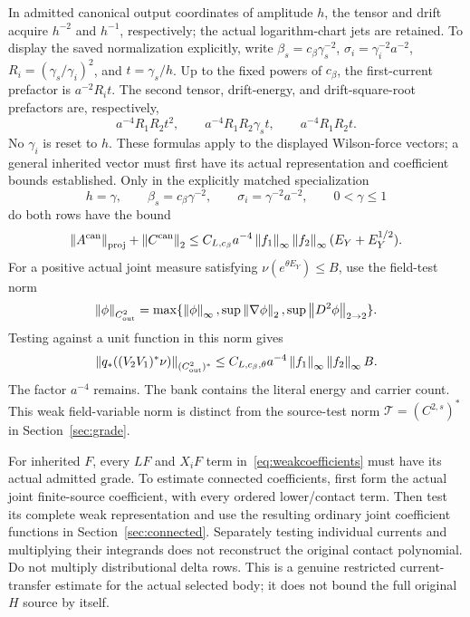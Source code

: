 \documentclass[11pt,letterpaper]{article}
\theoremstyle{plain}
\theoremstyle{remark}\newtheorem{remark}[theorem]{Scope}
\newcommand{\norm}[1]{\left\lVert#1\right\rVert}
\newcommand{\cT}{\mathcal T}\newcommand{\eps}{\varepsilon}
\begin{document}
In admitted canonical output coordinates of amplitude $h$, the tensor and
drift acquire $h^{-2}$ and $h^{-1}$, respectively; the actual logarithm-chart
jets are retained. To display the saved normalization explicitly, write
$\beta_s=c_\beta\gamma_s^{-2}$, $\sigma_i=\gamma_i^{-2}a^{-2}$,
$R_i=(\gamma_s/\gamma_i)^2$, and $t=\gamma_s/h$. Up to the fixed powers
of $c_\beta$, the first-current prefactor is $a^{-2}R_it$. The second
tensor, drift-energy, and drift-square-root prefactors are, respectively,
\begin{equation}
a^{-4}R_1R_2t^2,\qquad
a^{-4}R_1R_2\gamma_st,\qquad
a^{-4}R_1R_2t.
\label{eq:savedcurrentratios}
\end{equation}
No $\gamma_i$ is reset to $h$. These formulas apply to the displayed
Wilson-force vectors; a general inherited vector must first have its actual
representation and coefficient bounds established. Only in the explicitly
matched specialization
\begin{equation}
h=\gamma,\qquad \beta_s=c_\beta\gamma^{-2},\qquad
\sigma_i=\gamma^{-2}a^{-2},\qquad 0<\gamma\le1
\label{eq:matchedcurrent}
\end{equation}
do both rows have the bound
\begin{equation}
\norm{A^{\rm can}}_{\rm proj}+\norm{C^{\rm can}}_2
\le C_{L,c_\beta}a^{-4}\norm{f_1}_\infty\norm{f_2}_\infty
(E_Y+E_Y^{1/2}).
\label{eq:physicalcurrentbound}
\end{equation}
For a positive actual joint measure satisfying
$\nu(e^{\theta E_Y})\le B$, use the field-test norm
\begin{equation}
\norm\phi_{C^2_{\rm out}}
=\max\{\norm\phi_\infty,\sup\norm{\nabla\phi}_2,
\sup\norm{D^2\phi}_{2\to2}\}.
\label{eq:outputtestnorm}
\end{equation}
Testing against a unit function in this norm gives
\begin{equation}
\norm{q_*( (V_2V_1)^*\nu)}_{(C^2_{\rm out})^*}
\le C_{L,c_\beta,\theta}a^{-4}
\norm{f_1}_\infty\norm{f_2}_\infty B.
\label{eq:weakcurrentbound}
\end{equation}
The factor $a^{-4}$ remains. The bank contains the literal energy and carrier
count. This weak field-variable norm is distinct from the source-test norm
$\cT=(C^{2,s})^*$ in Section~\ref{sec:grade}.

For inherited $F$, every $LF$ and $X_iF$ term in~\eqref{eq:weakcoefficients}
must have its actual admitted grade. To estimate connected coefficients,
first form the actual joint finite-source coefficient, with every ordered
lower/contact term. Then test its complete weak representation and use the
resulting ordinary joint coefficient functions in Section~\ref{sec:connected}.
Separately testing individual currents and multiplying their integrands does
not reconstruct the original contact polynomial. Do not multiply
distributional delta rows.
This is a genuine restricted current-transfer estimate for the actual
selected body; it does not bound the full original $H$ source by itself.
\end{document}
